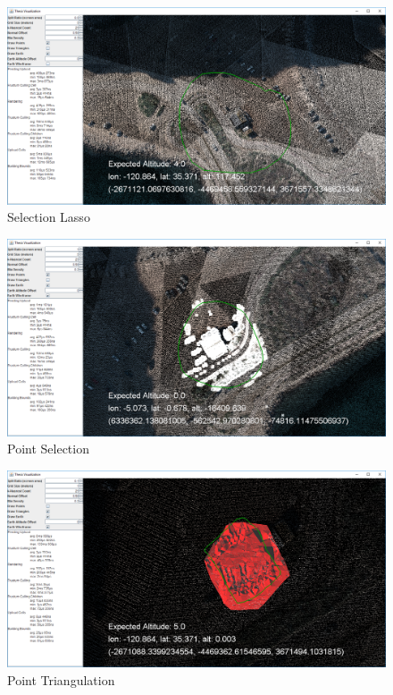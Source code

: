 \begin{figure}[htp]
\begin{center}
  \includegraphics[width=.75\linewidth]{images/lasso.png}
  \caption{Selection Lasso}
  \label{fig:lasso}
\end{center}
\end{figure}

\begin{figure}[htp]
\begin{center}
  \includegraphics[width=.75\linewidth]{images/pointSelection.png}
  \caption{Point Selection}
  \label{fig:pointSelection}
\end{center}
\end{figure}

\begin{figure}[htp]
\begin{center}
  \includegraphics[width=.75\linewidth]{images/triangulation.png}
  \caption{Point Triangulation}
  \label{fig:triangulation}
\end{center}
\end{figure}
